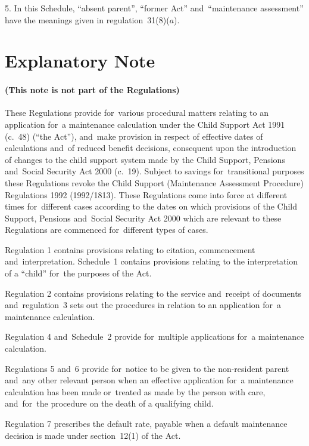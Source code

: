 \documentclass[12pt,a4paper]{article}
\begin{document}
5.  In this Schedule, “absent parent”, “former Act” and~“maintenance assessment” have the meanings given in regulation~31(8)($a$).

\part{Explanatory Note}

\renewcommand\parthead{— Explanatory Note}

\subsection*{(This note is not part of the Regulations)}

These Regulations provide for~various procedural matters relating to an application for~a maintenance calculation under the Child Support Act 1991 (c.\ 48) (“the Act”), and~make provision in respect of effective dates of calculations and~of reduced benefit decisions, consequent upon the introduction of changes to the child support system made by the Child Support, Pensions and~Social Security Act 2000 (c.~19). Subject to savings for~transitional purposes these Regulations revoke the Child Support (Maintenance Assessment Procedure) Regulations 1992 (1992/1813). These Regulations come into force at different times for~different cases according to the dates on which provisions of the Child Support, Pensions and~Social Security Act 2000 which are relevant to these Regulations are commenced for~different types of cases.

Regulation 1 contains provisions relating to citation, commencement and~interpretation. Schedule~1 contains provisions relating to the interpretation of a “child” for~the purposes of the Act.

Regulation 2 contains provisions relating to the service and~receipt of documents and~regulation~3 sets out the procedures in relation to an application for~a maintenance calculation.

Regulation 4 and~Schedule~2 provide for~multiple applications for~a maintenance calculation.

Regulations 5 and~6 provide for~notice to be given to the non-resident parent and~any other relevant person when an effective application for~a maintenance calculation has been made or~treated as made by the person with care, and~for~the procedure on the death of a qualifying child.

Regulation 7 prescribes the default rate, payable when a default maintenance decision is made under section~12(1) of the Act.
\end{document}
